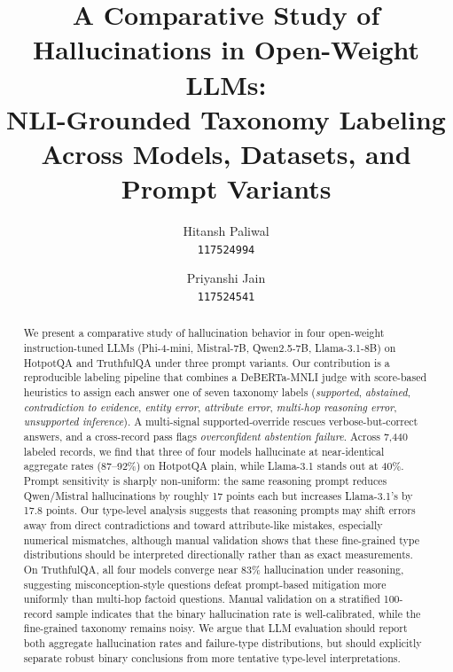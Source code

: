 \documentclass[11pt,a4paper]{article}
\newcommand{\lbl}[1]{\textit{#1}}
\begin{document}
\title{A Comparative Study of Hallucinations in Open-Weight LLMs:\\
       NLI-Grounded Taxonomy Labeling Across Models, Datasets, and Prompt Variants}

\author{
  Hitansh Paliwal \\
  \texttt{117524994}
  \and
  Priyanshi Jain \\
  \texttt{117524541}
}

\date{}

\maketitle

\begin{abstract}
We present a comparative study of hallucination behavior in four open-weight instruction-tuned LLMs (Phi-4-mini, Mistral-7B, Qwen2.5-7B, Llama-3.1-8B) on HotpotQA and TruthfulQA under three prompt variants. Our contribution is a reproducible labeling pipeline that combines a DeBERTa-MNLI judge with score-based heuristics to assign each answer one of seven taxonomy labels (\lbl{supported}, \lbl{abstained}, \lbl{contradiction to evidence}, \lbl{entity error}, \lbl{attribute error}, \lbl{multi-hop reasoning error}, \lbl{unsupported inference}). A multi-signal supported-override rescues verbose-but-correct answers, and a cross-record pass flags \lbl{overconfident abstention failure}. Across 7{,}440 labeled records, we find that three of four models hallucinate at near-identical aggregate rates (87--92\%) on HotpotQA plain, while Llama-3.1 stands out at 40\%. Prompt sensitivity is sharply non-uniform: the same reasoning prompt reduces Qwen/Mistral hallucinations by roughly 17 points each but increases Llama-3.1's by 17.8 points. Our type-level analysis suggests that reasoning prompts may shift errors away from direct contradictions and toward attribute-like mistakes, especially numerical mismatches, although manual validation shows that these fine-grained type distributions should be interpreted directionally rather than as exact measurements. On TruthfulQA, all four models converge near 83\% hallucination under reasoning, suggesting misconception-style questions defeat prompt-based mitigation more uniformly than multi-hop factoid questions. Manual validation on a stratified 100-record sample indicates that the binary hallucination rate is well-calibrated, while the fine-grained taxonomy remains noisy. We argue that LLM evaluation should report both aggregate hallucination rates and failure-type distributions, but should explicitly separate robust binary conclusions from more tentative type-level interpretations.
\end{abstract}
\end{document}
